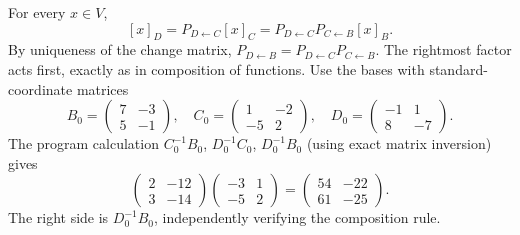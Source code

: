 For every $x\in V$,
\[
 [x]_D=P_{D\leftarrow C}[x]_C
       =P_{D\leftarrow C}P_{C\leftarrow B}[x]_B.
\]
By uniqueness of the change matrix,
$P_{D\leftarrow B}=P_{D\leftarrow C}P_{C\leftarrow B}$.
The rightmost factor acts first, exactly as in composition of functions.
Use the bases with standard-coordinate matrices
\[
 B_0=\begin{pmatrix}7&-3\\5&-1\end{pmatrix},\quad
 C_0=\begin{pmatrix}1&-2\\-5&2\end{pmatrix},\quad
 D_0=\begin{pmatrix}-1&1\\8&-7\end{pmatrix}.
\]
The program calculation $C_0^{-1}B_0$, $D_0^{-1}C_0$, $D_0^{-1}B_0$
(using exact matrix inversion) gives
\[
 \begin{pmatrix}2&-12\\3&-14\end{pmatrix}
 \begin{pmatrix}-3&1\\-5&2\end{pmatrix}
 =\begin{pmatrix}54&-22\\61&-25\end{pmatrix}.
\]
The right side is $D_0^{-1}B_0$, independently verifying the composition rule.
